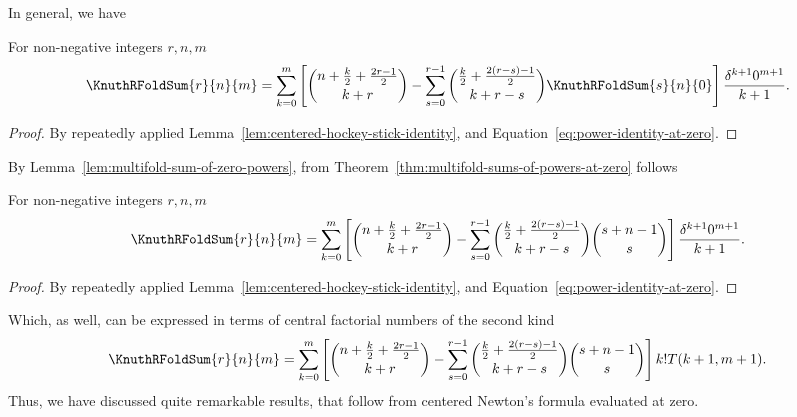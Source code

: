 In general, we have
\begin{theorem}
  \label{thm:multifold-sums-of-powers-at-zero}
  For non-negative integers $r,n,m$
  \begin{align*}
    \KnuthRFoldSum{r}{n}{m}
    =
    \sum_{k=0}^{m}
    \left[
      \binom{n+\frac{k}{2}+\frac{2r-1}{2}}{k+r}
      -
      \sum_{s=0}^{r-1} \binom{\frac{k}{2} + \frac{2(r-s)-1}{2}}{k+r-s}
      \KnuthRFoldSum{s}{n}{0}
    \right] \frac{\delta^{k+1} 0^{m+1}}{k+1}.
  \end{align*}
  \begin{proof}
    By repeatedly applied Lemma~\eqref{lem:centered-hockey-stick-identity},
    and Equation~\eqref{eq:power-identity-at-zero}.
  \end{proof}
\end{theorem}
By Lemma~\eqref{lem:multifold-sum-of-zero-powers}, from
Theorem~\eqref{thm:multifold-sums-of-powers-at-zero} follows
\begin{proposition}
  \label{prop:multifold-sums-of-powers-at-zero-binomial-form}
  For non-negative integers $r,n,m$
  \begin{align*}
    \KnuthRFoldSum{r}{n}{m}
    =
    \sum_{k=0}^{m}
    \left[
      \binom{n+\frac{k}{2}+\frac{2r-1}{2}}{k+r}
      -
      \sum_{s=0}^{r-1} \binom{\frac{k}{2} + \frac{2(r-s)-1}{2}}{k+r-s}
      \binom{s+n-1}{s}
    \right] \frac{\delta^{k+1} 0^{m+1}}{k+1}.
  \end{align*}
  \begin{proof}
    By repeatedly applied Lemma~\eqref{lem:centered-hockey-stick-identity},
    and Equation~\eqref{eq:power-identity-at-zero}.
  \end{proof}
\end{proposition}
Which, as well, can be expressed in terms of central
factorial numbers of the second kind
\begin{align*}
  \KnuthRFoldSum{r}{n}{m}
  =
  \sum_{k=0}^{m}
  \left[
    \binom{n+\frac{k}{2}+\frac{2r-1}{2}}{k+r}
    -
    \sum_{s=0}^{r-1} \binom{\frac{k}{2} + \frac{2(r-s)-1}{2}}{k+r-s}
    \binom{s+n-1}{s}
  \right] k! T(k+1, m+1).
\end{align*}
Thus, we have discussed quite remarkable results, that follow from
centered Newton's formula evaluated at zero.
